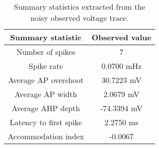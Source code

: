 \begin{table}[!htb]
  \caption{Summary statistics extracted from the noisy observed voltage trace.}
  \begin{center}
    \begin{tabular}{cc}
      \toprule
      \textbf{Summary statistic} & \textbf{Observed value} \\
      \midrule
      Number of spikes &  7 \\
      Spike rate &  0.0700 mHz \\
      Average AP overshoot & 30.7223 mV  \\
      Average AP width & 2.0679 mV \\
      Average AHP depth & -74.3394 mV \\
      Latency to first spike & 2.2750 ms \\
      Accommodation index &  -0.0067 \\
      \bottomrule
    \end{tabular}
  \end{center}
  \label{tab:hh_noisy_sumstats}
\end{table}

